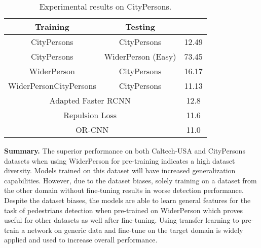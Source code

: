 \documentclass[journal]{IEEEtran}
\begin{document}
\begin{table}[t]
\begin{center}
\caption{Experimental results on CityPersons.}
\label{tab:citypersons}
\setlength{\tabcolsep}{12.5pt}
\begin{tabular}{ccc}
\toprule[2pt]
{Training} & {Testing} &  \\
\hline
CityPersons & CityPersons & {12.49}\\
CityPersons & WiderPerson (Easy) & {73.45}\\
WiderPerson & CityPersons & {16.17}\\
WiderPersonCityPersons & CityPersons & 11.13\\
\hline
\hline
\multicolumn{2}{c}{Adapted Faster RCNN~\cite{DBLP:conf/cvpr/ZhangBS17}} &12.8\\
\multicolumn{2}{c}{Repulsion Loss~\cite{DBLP:journals/corr/abs-1711-07752}} &11.6\\
\multicolumn{2}{c}{OR-CNN\cite{zhang2018occlusion}} &11.0\\
\bottomrule[2pt]
\end{tabular}
\end{center}
\end{table}

{\flushleft \textbf{Summary. }}
The superior performance on both Caltech-USA and CityPersons datasets when using WiderPerson for pre-training indicates a high dataset diversity. Models trained on this dataset will have increased generalization capabilities. However, due to the dataset biases, solely training on a dataset from the other domain without fine-tuning results in worse detection performance. Despite the dataset biases, the models are able to learn general features for the task of pedestrians detection when pre-trained on WiderPerson which proves useful for other datasets as well after fine-tuning. Using transfer learning to pre-train a network on generic data and fine-tune on the target domain is widely applied and used to increase overall performance. 
\end{document}
